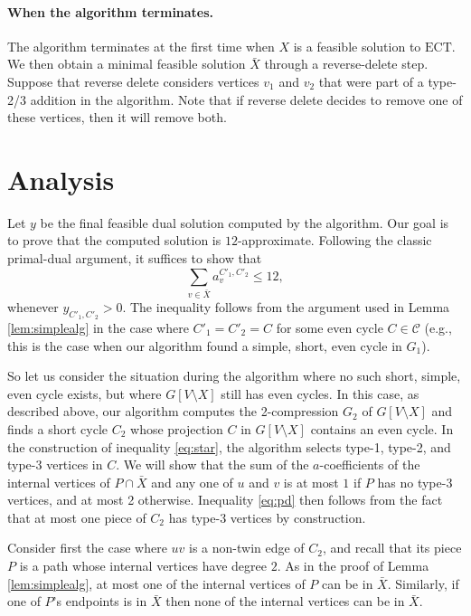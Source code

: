 \documentclass{article}
\newcommand{\ect}{\ensuremath{\mbox{ECT}}}
\newcommand{\C}{\ensuremath{\mathcal{C}}}
\newcommand{\0}{\mathbb{0}}
\newcommand{\1}{\mathbb{1}}
\begin{document}
\paragraph{When the algorithm terminates.}

The algorithm terminates at the first time when $X$ is a feasible solution to \ect. We
then obtain a minimal feasible solution $\bar{X}$ through a reverse-delete step. 
Suppose that reverse delete considers vertices $v_1$ and $v_2$ that were part of a
type-2/3 addition in the algorithm. Note that if reverse delete decides to remove one of
these vertices, then it will remove both. 

\section{Analysis}

Let $y$ be the final feasible dual solution computed by the algorithm. 
Our goal is to prove that the computed solution is $12$-approximate. 
Following the classic primal-dual argument, it
suffices to show that
\begin{equation}\label{eq:pd}
\sum_{v \in \bar{X}} a^{C'_1,C'_2}_v \leq 12,
\end{equation}
whenever $y_{C'_1,C'_2}>0$. The inequality follows from the argument used in Lemma 
\ref{lem:simplealg} in the case where $C'_1=C'_2=C$ for some even cycle $C \in \C$
(e.g., this is the
case when our algorithm found a simple, short, even cycle in $G_1$).

So let us consider the situation during the algorithm where no such short, simple, even
cycle exists, but where $G[V\setminus X]$ still has even cycles. 
In this case, as described above, our algorithm computes the 2-compression $G_2$ of $G
[V\setminus X]$ and finds a short cycle $C_2$ whose projection $C$ in $G[V\setminus
X]$ contains an even cycle. In the construction of inequality \eqref{eq:star}, the
algorithm selects
type-1, type-2, and type-3 vertices in $C$.
We will show that the sum of the $a$-coefficients of
the internal vertices of $P \cap \bar{X}$ and any one of $u$ and $v$ is at most $1$ if $P$
has no type-3 vertices, and at most 2 otherwise. Inequality 
\eqref{eq:pd} then follows from the fact that at most one piece of $C_2$ has type-3
vertices by construction. 

Consider first the case where $uv$ is a non-twin edge of $C_2$, and recall that its
piece $P$ is a path whose internal vertices have degree $2$. As in the proof of Lemma 
\ref{lem:simplealg}, at most one of the internal vertices of $P$ can be in $\bar{X}$.
Similarly, if
one of $P$'s endpoints is in $\bar{X}$ then none of the internal vertices can be in
$\bar{X}$.
\end{document}
